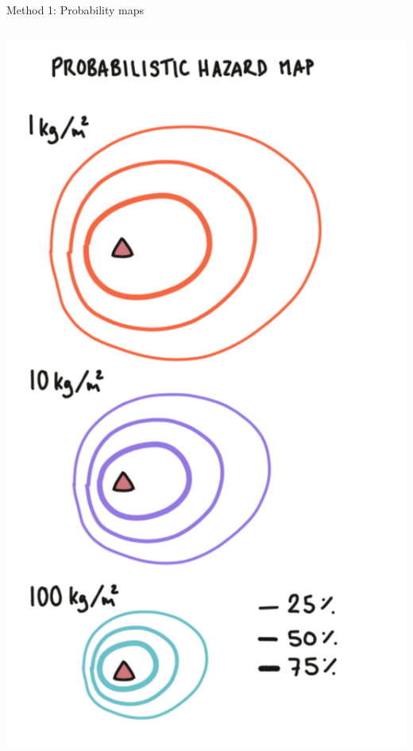 \documentclass[10pt,aspectratio=169]{beamer}
\begin{document}
\begin{frame}{Method 1: Probability maps}
{\begin{columns}[T]
      \begin{column}{0.35\textwidth}	
        \centering \includegraphics[width=.9\textwidth]{img/prob_map.png}
      \end{column}
    \end{columns}
  }
\end{frame}
\end{document}
